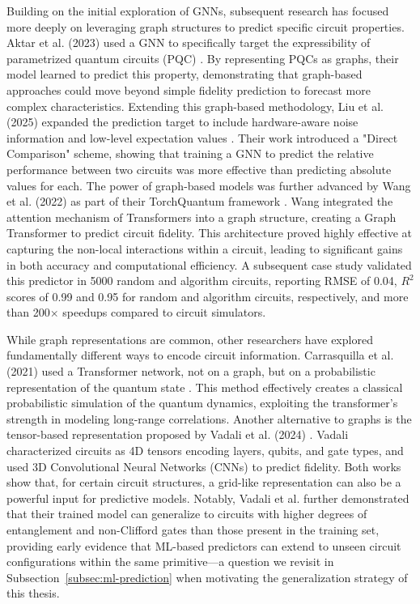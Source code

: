 \documentclass{article}
\begin{document}
Building on the initial exploration of GNNs, subsequent research has focused more deeply on leveraging graph structures to predict specific circuit properties. Aktar et al. (2023) used a GNN to specifically target the expressibility of parametrized quantum circuits (PQC) \cite{aktarPredictingExpressibilityParameterized_2023}. By representing PQCs as graphs, their model learned to predict this property, demonstrating that graph-based approaches could move beyond simple fidelity prediction to forecast more complex characteristics. Extending this graph-based methodology, Liu et al. (2025) expanded the prediction target to include hardware-aware noise information and low-level expectation values \cite{liuOutputPredictionQuantum_2025}. Their work introduced a "Direct Comparison" scheme, showing that training a GNN to predict the relative performance between two circuits was more effective than predicting absolute values for each. The power of graph-based models was further advanced by Wang et al. (2022) as part of their TorchQuantum framework \cite{wangQuEstGraphTransformer_2022}. Wang integrated the attention mechanism of Transformers into a graph structure, creating a Graph Transformer to predict circuit fidelity. This architecture proved highly effective at capturing the non-local interactions within a circuit, leading to significant gains in both accuracy and computational efficiency. A subsequent case study \cite{wangTorchQuantumCaseStudya_2022} validated this predictor in 5000 random and algorithm circuits, reporting RMSE of 0.04, $R^2$ scores of 0.99 and 0.95 for random and algorithm circuits, respectively, and more than 200$\times$ speedups compared to circuit simulators.

While graph representations are common, other researchers have explored fundamentally different ways to encode circuit information. Carrasquilla et al. (2021) used a Transformer network, not on a graph, but on a probabilistic representation of the quantum state \cite{carrasquillaProbabilisticSimulationQuantum_2021}. This method effectively creates a classical probabilistic simulation of the quantum dynamics, exploiting the transformer's strength in modeling long-range correlations. Another alternative to graphs is the tensor-based representation proposed by Vadali et al. (2024) \cite{vadaliQuantumCircuitFidelity_2024}. Vadali characterized circuits as 4D tensors encoding layers, qubits, and gate types, and used 3D Convolutional Neural Networks (CNNs) to predict fidelity. Both works show that, for certain circuit structures, a grid-like representation can also be a powerful input for predictive models. Notably, Vadali et al. further demonstrated that their trained model can generalize to circuits with higher degrees of entanglement and non-Clifford gates than those present in the training set, providing early evidence that ML-based predictors can extend to unseen circuit configurations within the same primitive---a question we revisit in Subsection~\ref{subsec:ml-prediction} when motivating the generalization strategy of this thesis.
\end{document}
